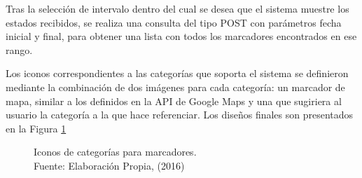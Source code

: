 Tras la selección de intervalo dentro del cual se desea que el sistema muestre los estados recibidos, se realiza una consulta del tipo POST con parámetros fecha inicial y final, para obtener una lista con todos los marcadores encontrados en ese rango.

Los iconos correspondientes a las categorías que soporta el sistema se definieron mediante la combinación de dos imágenes para cada categoría: un marcador de mapa, similar a los definidos en la API de Google Maps y una que sugiriera al usuario la categoría a la que hace referenciar. Los diseños finales son presentados en la Figura \ref{fig:categoriasFig}

\begin{figure}[H]
\centering
{}\hfill
{}\hfill
{}\hfill
\vfill
{}\hfill
{}\hfill
{}\hfill
\caption[Categorías para marcadores.]{Iconos de categorías para marcadores.\\Fuente: Elaboración Propia, (2016)}
\label{fig:categoriasFig}
\end{figure}


